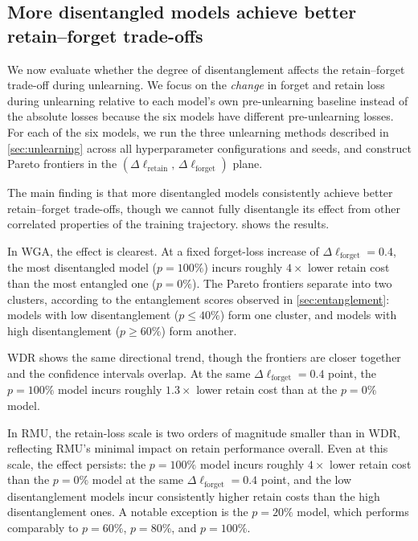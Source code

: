 \documentclass{article} %
\begin{document}
\subsection{More disentangled models achieve better retain--forget trade-offs}
\label{sec:results}

We now evaluate whether the degree of disentanglement affects the retain--forget trade-off during unlearning.
We focus on the \emph{change} in forget and retain loss during unlearning relative to each model's own pre-unlearning baseline instead of the absolute losses because the six models have different pre-unlearning losses.
For each of the six models, we run the three unlearning methods described in \cref{sec:unlearning} across all hyperparameter configurations and seeds, and construct Pareto frontiers in the $(\Delta\ell_\text{retain},\, \Delta\ell_\text{forget})$ plane.

The main finding is that more disentangled models consistently achieve better retain--forget trade-offs, though we cannot fully disentangle its effect from other correlated properties of the training trajectory.  shows the results.

In WGA, the effect is clearest. At a fixed forget-loss increase of $\Delta\ell_\text{forget} = 0.4$, the most disentangled model ($p{=}100\%$) incurs roughly $4\times$ lower retain cost than the most entangled one ($p{=}0\%$). The Pareto frontiers separate into two clusters, according to the entanglement scores observed in \cref{sec:entanglement}: models with low disentanglement ($p \leq 40\%$) form one cluster, and models with high disentanglement ($p \geq 60\%$) form another.

WDR shows the same directional trend, though the frontiers are closer together and the confidence intervals overlap. At the same $\Delta\ell_\text{forget} = 0.4$ point, the $p=100\%$ model incurs roughly $1.3\times$ lower retain cost than at the $p=0\%$ model.

In RMU, the retain-loss scale is two orders of magnitude smaller than in WDR, reflecting RMU's minimal impact on retain performance overall. Even at this scale, the effect persists: the $p=100\%$ model incurs roughly $4\times$ lower retain cost than the $p=0\%$ model at the same $\Delta\ell_\text{forget} = 0.4$ point, and the low disentanglement models incur consistently higher retain costs than the high disentanglement ones. A notable exception is the $p=20\%$ model, which performs comparably to $p=60\%$, $p=80\%$, and $p=100\%$.
\end{document}
